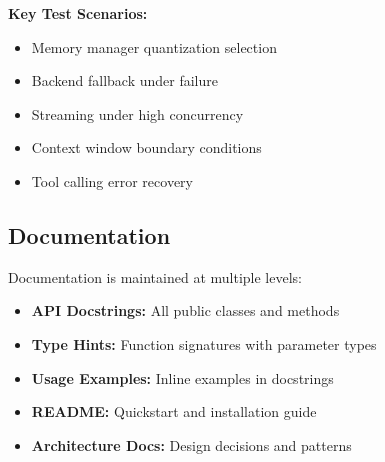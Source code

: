 \textbf{Key Test Scenarios:}
\begin{itemize}
    \item Memory manager quantization selection
    \item Backend fallback under failure
    \item Streaming under high concurrency
    \item Context window boundary conditions
    \item Tool calling error recovery
\end{itemize}

\subsection{Documentation}

Documentation is maintained at multiple levels:

\begin{itemize}
    \item \textbf{API Docstrings:} All public classes and methods
    \item \textbf{Type Hints:} Function signatures with parameter types
    \item \textbf{Usage Examples:} Inline examples in docstrings
    \item \textbf{README:} Quickstart and installation guide
    \item \textbf{Architecture Docs:} Design decisions and patterns
\end{itemize}

